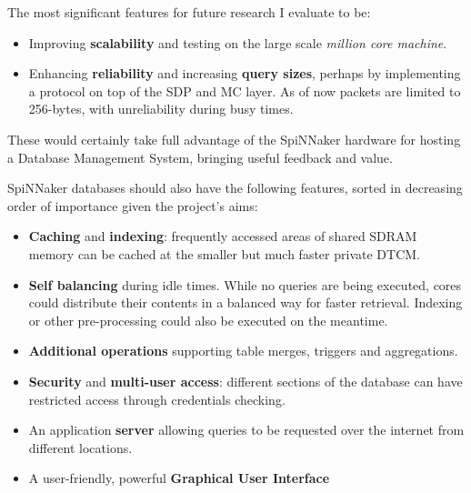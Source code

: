 The most significant features for future research I evaluate to be:

\begin{itemize}
	\item Improving \textbf{scalability} and testing on the large scale \textit{million core machine}.
	\item Enhancing \textbf{reliability} and increasing \textbf{query sizes}, perhaps by implementing a protocol on top of the SDP and MC layer. As of now packets are limited to 256-bytes, with unreliability during busy times.
\end{itemize}

These would certainly take full advantage of the SpiNNaker hardware for hosting a Database Management System, bringing useful feedback and value.

SpiNNaker databases should also have the following features, sorted in decreasing order of importance given the project's aims:

\begin{itemize}
	\item \textbf{Caching} and \textbf{indexing}: frequently accessed areas of shared SDRAM memory can be cached at the smaller but much faster private DTCM.
	\item \textbf{Self balancing} during idle times. While no queries are being executed, cores could distribute their contents in a balanced way for faster retrieval. Indexing or other pre-processing could also be executed on the meantime.	
	\item \textbf{Additional operations} supporting table merges, triggers and aggregations.
	\item \textbf{Security} and \textbf{multi-user access}: different sections of the database can have restricted access through credentials checking.
	\item An application \textbf{server} allowing queries to be requested over the internet from different locations.
	\item A user-friendly, powerful \textbf{Graphical User Interface}
\end{itemize}